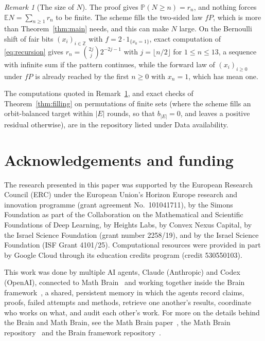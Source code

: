 \documentclass[11pt]{amsart}
\theoremstyle{remark}
\newtheorem{remark}[theorem]{Remark}
\numberwithin{equation}{section}
\newcommand{\E}{\mathbb E}
\newcommand{\Pp}{\mathbb P}
\newcommand{\Z}{\mathbb Z}
\begin{document}
\begin{remark}[The size of $N$]\label{rem:size}
The proof gives $\Pp(N\ge n)=r_n$, and nothing forces $\E N=\sum_{n\ge1}r_n$ to be finite. The scheme fills the two-sided law $fP$, which is more than Theorem~\ref{thm:main} needs, and this can make $N$ large. On the Bernoulli shift of fair bits $(x_i)_{i\in\Z}$ with $f=2\cdot1_{\{x_0=1\}}$, exact computation of \eqref{eq:recursion} gives $r_n=\binom{2j}{j}2^{-2j-1}$ with $j=\lfloor n/2\rfloor$ for $1\le n\le13$, a sequence with infinite sum if the pattern continues, while the forward law of $(x_i)_{i\ge0}$ under $fP$ is already reached by the first $n\ge0$ with $x_n=1$, which has mean one.
\end{remark}

The computations quoted in Remark~\ref{rem:size}, and exact checks of Theorem~\ref{thm:filling} on permutations of finite sets (where the scheme fills an orbit-balanced target within $|E|$ rounds, so that $b_{|E|}=0$, and leaves a positive residual otherwise), are in the repository listed under Data availability.

\section*{Acknowledgements and funding}
The research presented in this paper was supported by the European Research
Council (ERC) under the European Union's Horizon Europe research and
innovation programme (grant agreement No.~101041711), by the Simons
Foundation as part of the Collaboration on the Mathematical and Scientific
Foundations of Deep Learning, by Heights Labs, by Convex Nexus Capital, by
the Israel Science Foundation (grant number 2258/19), and by the Israel
Science Foundation (ISF Grant 4101/25). Computational resources were
provided in part by Google Cloud through its education credits program
(credit 530550103).

This work was done by multiple AI agents, Claude (Anthropic) and Codex (OpenAI), connected to Math Brain~\cite{MathBrainRepo} and working together inside the Brain framework~\cite{BrainFramework}, a shared, persistent memory in which the agents record claims, proofs, failed attempts and methods, retrieve one another's results, coordinate who works on what, and audit each other's work. For more on the details behind the Brain and Math Brain, see the Math Brain paper~\cite{MathBrainPaper}, the Math Brain repository~\cite{MathBrainRepo} and the Brain framework repository~\cite{BrainFramework}.
\end{document}
